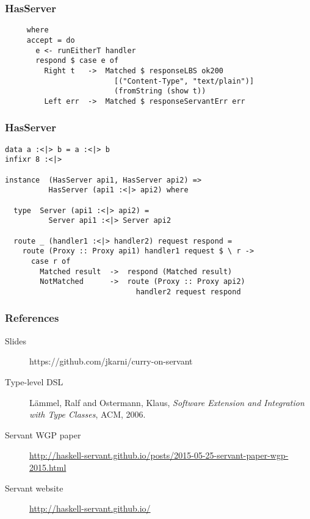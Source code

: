 \documentclass{beamer}
\begin{document}
\begin{frame}[fragile]
\frametitle{HasServer}
\begin{verbatim}
     where
     accept = do
       e <- runEitherT handler
       respond $ case e of
         Right t   ->  Matched $ responseLBS ok200
                         [("Content-Type", "text/plain")]
                         (fromString (show t))
         Left err  ->  Matched $ responseServantErr err
\end{verbatim}
\end{frame}

\begin{frame}[fragile]
\frametitle{HasServer}
\begin{verbatim}
data a :<|> b = a :<|> b
infixr 8 :<|>

instance  (HasServer api1, HasServer api2) =>
          HasServer (api1 :<|> api2) where

  type  Server (api1 :<|> api2) =
          Server api1 :<|> Server api2

  route _ (handler1 :<|> handler2) request respond =
    route (Proxy :: Proxy api1) handler1 request $ \ r ->
      case r of
        Matched result  ->  respond (Matched result)
        NotMatched      ->  route (Proxy :: Proxy api2)
                              handler2 request respond
\end{verbatim}
\end{frame}

\begin{frame}
\frametitle{References}
\begin{description}
\item[Slides] https://github.com/jkarni/curry-on-servant
\item[Type-level DSL] L\"{a}mmel, Ralf and Ostermann, Klaus,
\textit{Software Extension and Integration with Type Classes}, ACM, 2006.
\item[Servant WGP paper]
\url{http://haskell-servant.github.io/posts/2015-05-25-servant-paper-wgp-2015.html}
\item[Servant website] \url{http://haskell-servant.github.io/}
\end{description}
\end{frame}
\end{document}
